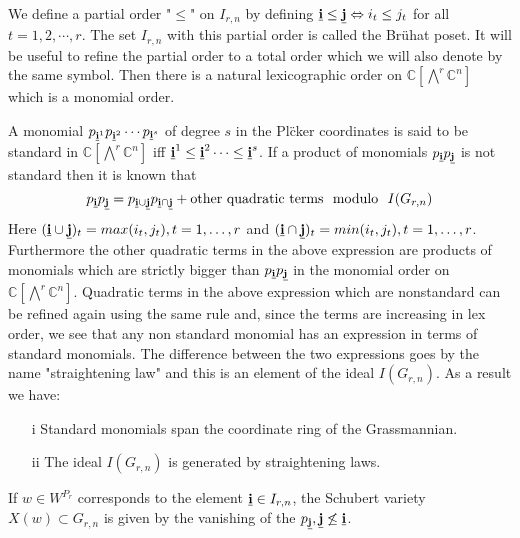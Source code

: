  We define a partial order "$\leq$" on $I_{r,n}$ by defining $ {\bf \underline{i}} \leq {\bf \underline{j}} \Leftrightarrow i_t \leq j_t$ for all $t = 1,2,\cdots,r$. The set $I_{r,n}$ with this partial order is called the Br\"{u}hat poset.  It will be useful to refine the partial order to a total order which we will also denote by the same symbol. Then there is a natural lexicographic order on ${\mathbb C}[\bigwedge^r {\mathbb C}^n]$ which is a 
 monomial order.
 
 A monomial $p_{{\bf \underline{i}}^1} p_{{\bf \underline{i}}^2} \cdots p_{{\bf \underline{i}}^s}$ of degree $s$ in the Pl\"{c}ker coordinates is said to be standard in ${\mathbb C}[\bigwedge^r {\mathbb C}^n]$ iff 
 ${\bf \underline{i}}^1 \leq {\bf \underline{i}}^2 \cdots \leq {\bf \underline{i}}^s$.  If a product of monomials $p_{\bf \underline{i}} p_{\bf \underline{j}}$ is not standard then it is known that 
 \[ p_{\bf \underline{i}} p_{\bf \underline{j}} = p_{\bf \underline{i} \cup \bf \underline{j}}p_{\bf \underline{i} \cap \bf \underline{j}} + \text{other quadratic terms\ \ } \text{modulo\ \ }  I(G_{r,n}) \]
 Here $({\bf \underline{i} \cup \bf \underline{j}})_t = max(i_t, j_t), t = 1,\ldots,r$ and  $({\bf \underline{i} \cap \bf \underline{j}})_t = min (i_t, j_t), t = 1,\ldots,r$. 
 Furthermore the other quadratic terms in the above expression are products of monomials which are strictly bigger than $p_{\bf \underline{i}} p_{\bf \underline{j}}$ in the monomial order on ${\mathbb C}[\bigwedge^r {\mathbb C}^n]$. Quadratic terms in the above expression which are nonstandard can be refined again using the same rule and, since the terms are increasing in lex order, we see that any non standard monomial has an expression in terms of standard monomials. The difference between the two expressions goes by the name "straightening law" and this is an element of the ideal $I(G_{r,n})$. As a result we have:
 \begin{theorem} 
 \begin{itemize}
 \item[i] Standard monomials span the coordinate ring of the Grassmannian.
 \item[ii]  The ideal $I(G_{r,n})$ is generated by straightening laws.
  \end{itemize}
\end{theorem}

If $w \in W^{P_r}$ corresponds to the element ${\bf \underline{i}}  \in I_{r,n}$, the Schubert variety $X(w) \subset G_{r,n}$ is given by the vanishing of the $p_{\bf \underline{j}}, {\bf \underline{j}} \not \leq  {\bf \underline{i}}$.

